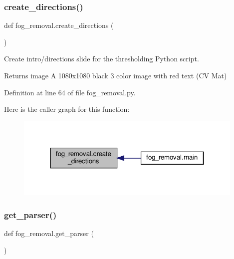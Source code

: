 \mbox{\label{namespacefog__removal_acc10907c635ab765dcf02a6fc6499620}} 
\subsubsection{\texorpdfstring{create\+\_\+directions()}{create\_directions()}}
{\footnotesize\ttfamily def fog\+\_\+removal.\+create\+\_\+directions (\begin{DoxyParamCaption}{ }\end{DoxyParamCaption})}



Create intro/directions slide for the thresholding Python script. 

\begin{DoxyReturn}{Returns}
image A 1080x1080 black 3 color image with red text (CV Mat) 
\end{DoxyReturn}


Definition at line 64 of file fog\+\_\+removal.\+py.

Here is the caller graph for this function\+:\nopagebreak
\begin{figure}[H]
\begin{center}
\leavevmode
\includegraphics[width=310pt]{namespacefog__removal_acc10907c635ab765dcf02a6fc6499620_icgraph}
\end{center}
\end{figure}
\mbox{\label{namespacefog__removal_a89c98f8f9a6d048485938fc05675ce9e}} 
\subsubsection{\texorpdfstring{get\+\_\+parser()}{get\_parser()}}
{\footnotesize\ttfamily def fog\+\_\+removal.\+get\+\_\+parser (\begin{DoxyParamCaption}{ }\end{DoxyParamCaption})}



